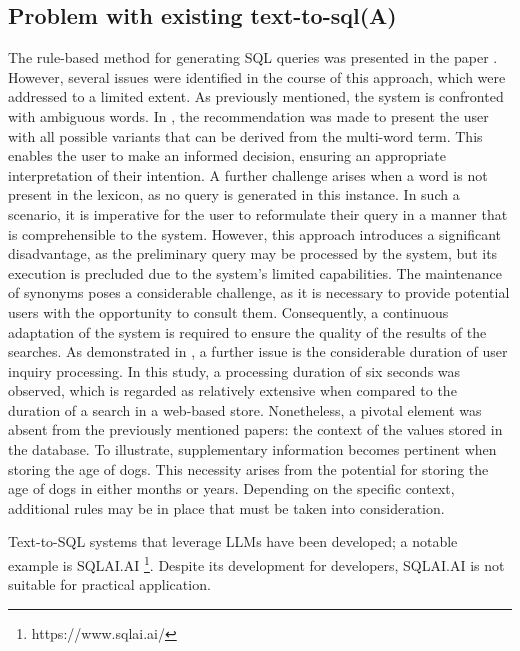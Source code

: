 \documentclass[../../submission.tex]{subfiles}
\begin{document}
\subsection{Problem with existing text-to-sql(A)}
The rule-based method for generating SQL queries was presented in the paper  \cite{popescuEtalTowardsTheoryOfNaturalLanguage}. 
However, several issues were identified in the course of this approach, which were addressed to a limited extent. 
As previously mentioned, the system is confronted with ambiguous words. 
In  \cite{popescuEtalTowardsTheoryOfNaturalLanguage}, the recommendation was made to present the user with all possible variants that can be derived from the multi-word term.  
This enables the user to make an informed decision, ensuring an appropriate interpretation of their intention. 
A further challenge arises when a word is not present in the lexicon, as no query is generated in this instance. 
In such a scenario, it is imperative for the user to reformulate their query in a manner that is comprehensible to the system. 
However, this approach introduces a significant disadvantage, as the preliminary query may be processed by the system, but its execution is precluded due to the system's limited capabilities. 
The maintenance of synonyms poses a considerable challenge, as it is necessary to provide potential users with the opportunity to consult them. Consequently, a continuous adaptation of the system is required to ensure the quality of the results of the searches. 
As demonstrated in \cite{popescuEtalTowardsTheoryOfNaturalLanguage}, a further issue is the considerable duration of user inquiry processing. In this study, a processing duration of six seconds was observed, which is regarded as relatively extensive when compared to the duration of a search in a web-based store.
Nonetheless, a pivotal element was absent from the previously mentioned papers: the context of the values stored in the database. 
To illustrate, supplementary information becomes pertinent when storing the age of dogs. 
This necessity arises from the potential for storing the age of dogs in either months or years. 
Depending on the specific context, additional rules may be in place that must be taken into consideration. 

Text-to-SQL systems that leverage LLMs have been developed; a notable example is SQLAI.AI \footnote{https://www.sqlai.ai/}. 
Despite its development for developers, SQLAI.AI is not suitable for practical application.
\end{document}
